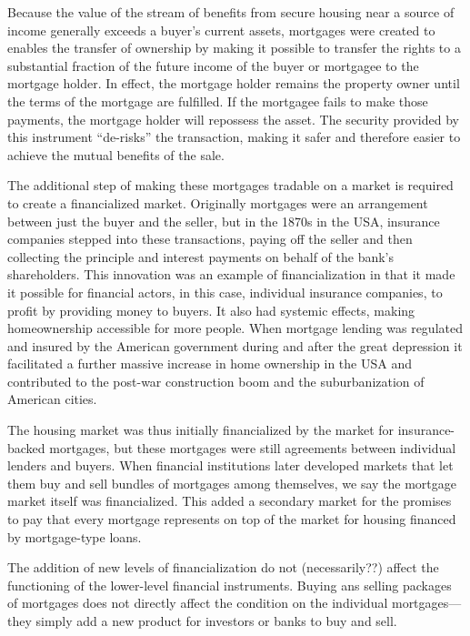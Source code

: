 Because the value of the stream of benefits from secure housing near a source of income generally exceeds a buyer's current assets, mortgages were created to  enables the transfer of ownership by making it possible to transfer the rights to a substantial fraction of the future income of the buyer or mortgagee to the mortgage holder. In effect, the mortgage holder remains the property owner until the terms of the mortgage are fulfilled.  If the mortgagee fails to make those payments, the mortgage holder will repossess the asset. The security provided by this instrument ``de-risks'' the transaction, making it safer and therefore easier to achieve the mutual benefits of the sale. 

The additional step of making these mortgages tradable on a market is required to create a financialized market. Originally mortgages were an arrangement between just the buyer and the seller, but in the 1870s in the USA, insurance companies stepped into these transactions, paying off the seller and then collecting the principle and interest payments on behalf of the bank's shareholders. This innovation was an example of financialization in that it made it possible for financial actors, in this case, individual insurance companies, to profit by providing money to buyers. It also had systemic effects, making homeownership accessible for more people. When mortgage lending was regulated and insured  by the American government during and after the great depression it facilitated a further massive increase in home ownership in the USA and contributed to the post-war construction boom and the suburbanization of American cities. 

The housing market was thus initially financialized by the market for insurance-backed mortgages, but these mortgages were still agreements between individual lenders and buyers. When financial institutions later developed markets that let them buy and sell bundles of mortgages among themselves, we say the mortgage market itself was financialized. This added %
a secondary market for the promises to pay that every mortgage represents on top of the market for housing financed by mortgage-type loans.
%

The addition of new levels of financialization do not (necessarily??) affect the functioning of the lower-level financial instruments. Buying ans selling packages of mortgages does not directly affect the condition  on the individual mortgages---they simply add a new product for investors or banks to buy and sell. 

